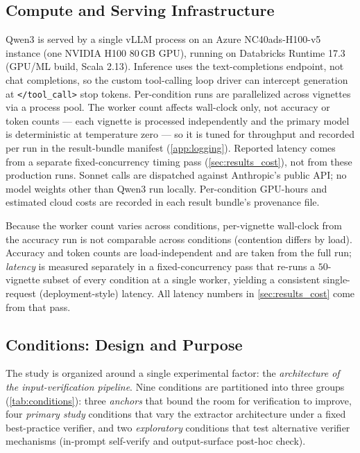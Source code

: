\subsection{Compute and Serving Infrastructure}
\label{sec:methods_compute}

Qwen3 is served by a single vLLM process on an Azure NC40ads-H100-v5
instance (one NVIDIA H100 80\,GB GPU), running on Databricks Runtime
17.3 (GPU/ML build, Scala 2.13). Inference uses the text-completions
endpoint, not chat completions, so the custom tool-calling loop
driver can intercept generation at \verb|</tool_call>| stop tokens.
Per-condition runs are parallelized across vignettes via a process
pool. The worker count affects wall-clock only, not accuracy or token
counts --- each vignette is processed independently and the primary
model is deterministic at temperature zero --- so it is tuned for
throughput and recorded per run in the result-bundle manifest
(\cref{app:logging}). Reported latency comes from a separate
fixed-concurrency timing pass (\cref{sec:results_cost}), not from these
production runs. Sonnet calls are dispatched against
Anthropic's public API; no model weights other than Qwen3 run locally.
Per-condition GPU-hours and estimated cloud costs are recorded in
each result bundle's provenance file.

Because the worker count varies across conditions, per-vignette
wall-clock from the accuracy run is not comparable across conditions
(contention differs by load). Accuracy and token counts are
load-independent and are taken from the full run; \emph{latency} is
measured separately in a fixed-concurrency pass that re-runs a
$50$-vignette subset of every condition at a single worker, yielding
a consistent single-request (deployment-style) latency. All latency
numbers in \cref{sec:results_cost} come from that pass.

\subsection{Conditions: Design and Purpose}
\label{sec:methods_conditions}

The study is organized around a single experimental factor: the
\emph{architecture of the input-verification pipeline}. Nine
conditions are partitioned into three groups (\cref{tab:conditions}):
three \emph{anchors} that bound the room for verification to improve,
four \emph{primary study} conditions that vary the extractor
architecture under a fixed best-practice verifier, and two
\emph{exploratory} conditions that test alternative verifier
mechanisms (in-prompt self-verify and output-surface post-hoc check).

